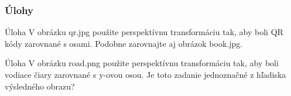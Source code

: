 \documentclass{beamer}
\begin{document}
\begin{frame}
\frametitle{Úlohy}
\begin{block}{Úloha}
V obrázku qr.jpg použite perspektívnu transformáciu tak, aby boli QR kódy zarovnané s osami. Podobne zarovnajte aj obrázok book.jpg.
\end{block}

\begin{block}{Úloha}
V obrázku road.png použite perspektívnu transformáciu tak, aby boli vodiace čiary zarovnané s y-ovou osou. Je toto zadanie jednoznačné z hľadiska výsledného obrazu?
\end{block}
\end{frame}
\end{document}
